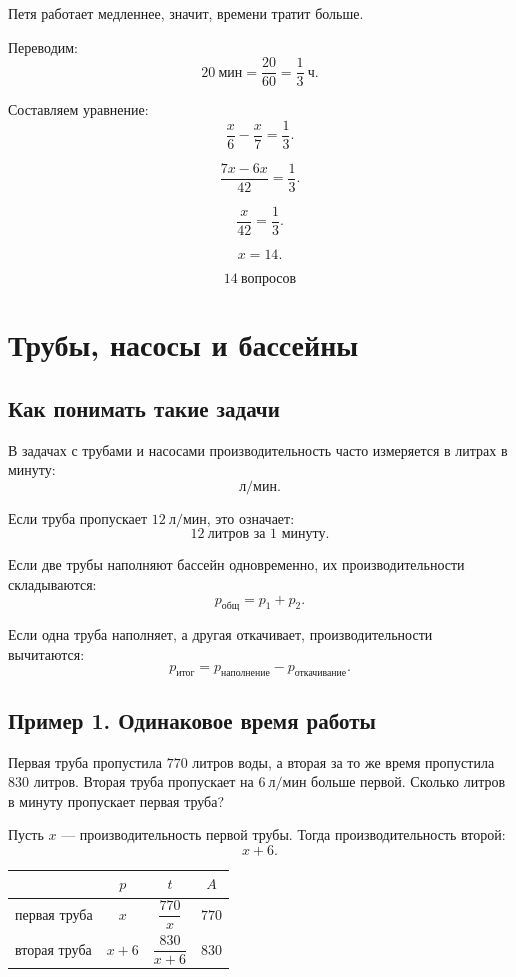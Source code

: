 \documentclass[a4paper,12pt]{article}
\newcommand{\ch}{\text{ч}}
\newcommand{\minut}{\text{мин}}
\newcommand{\lpm}{\text{л/мин}}
\begin{document}
Петя работает медленнее, значит, времени тратит больше.

Переводим:
\[
20\ \minut=\frac{20}{60}=\frac{1}{3}\ \ch.
\]

Составляем уравнение:
\[
\frac{x}{6}-\frac{x}{7}=\frac{1}{3}.
\]

\[
\frac{7x-6x}{42}=\frac{1}{3}.
\]

\[
\frac{x}{42}=\frac{1}{3}.
\]

\[
x=14.
\]

\[
\boxed{14\ \text{вопросов}}
\]

\section{Трубы, насосы и бассейны}

\subsection{Как понимать такие задачи}

В задачах с трубами и насосами производительность часто измеряется в литрах в минуту:
\[
\lpm.
\]

Если труба пропускает $12\ \lpm$, это означает:
\[
12\ \text{литров за } 1 \text{ минуту}.
\]

Если две трубы наполняют бассейн одновременно, их производительности складываются:
\[
p_{\text{общ}}=p_1+p_2.
\]

Если одна труба наполняет, а другая откачивает, производительности вычитаются:
\[
p_{\text{итог}}=p_{\text{наполнение}}-p_{\text{откачивание}}.
\]

\subsection{Пример 1. Одинаковое время работы}

Первая труба пропустила $770$ литров воды, а вторая за то же время пропустила $830$ литров. Вторая труба пропускает на $6\ \lpm$ больше первой. Сколько литров в минуту пропускает первая труба?

Пусть $x$ --- производительность первой трубы. Тогда производительность второй:
\[
x+6.
\]

\begin{center}
\renewcommand{\arraystretch}{1.35}
\begin{tabularx}{0.82\linewidth}{X c c c}
\toprule
 & $p$ & $t$ & $A$ \\
\midrule
первая труба & $x$ & $\dfrac{770}{x}$ & $770$ \\
вторая труба & $x+6$ & $\dfrac{830}{x+6}$ & $830$ \\
\bottomrule
\end{tabularx}
\end{center}
\end{document}
